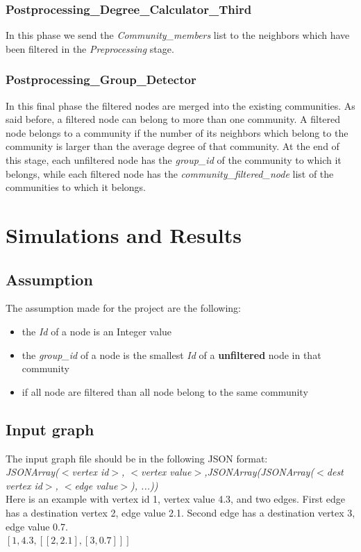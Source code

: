 \documentclass[12pt]{article}
\begin{document}
\subsubsection{Postprocessing\_Degree\_Calculator\_Third}
In this phase we send the \emph{Community\_members} list to the neighbors which have been filtered in the \emph{Preprocessing} stage.
\subsubsection{Postprocessing\_Group\_Detector}
In this final phase the filtered nodes are merged into the existing communities. As said before, a filtered node can belong to more than one community. A filtered node belongs to a community if the number of its neighbors which belong to the community is larger than the average degree of that community. At the end of this stage, each unfiltered node has the \emph{group\_id} of the community to which it belongs, while each filtered node has the \emph{community\_filtered\_node} list of the communities to which it belongs.
\section{Simulations and Results}
\subsection{Assumption}
The assumption made for the project are the following:
\begin{itemize}
    \item the \emph{Id} of a node is an Integer value
    \item the \emph{group\_id} of a node is the smallest \emph{Id} of a \textbf{unfiltered }node in that community
    \item if all node are filtered than all node belong to the same community
\end{itemize}
\subsection{Input graph}
The input graph file should be in the following JSON format:\\
     \emph{JSONArray($<$vertex id$>$, $<$vertex value$>$,JSONArray(JSONArray($<$dest vertex id$>$, $<$edge value$>$), ...))}\\
Here is an example with vertex id 1, vertex value 4.3, and two edges.
First edge has a destination vertex 2, edge value 2.1. Second edge has a destination vertex 3, edge value 0.7.\\
    $[1,4.3,[[2,2.1],[3,0.7]]]$
\end{document}
